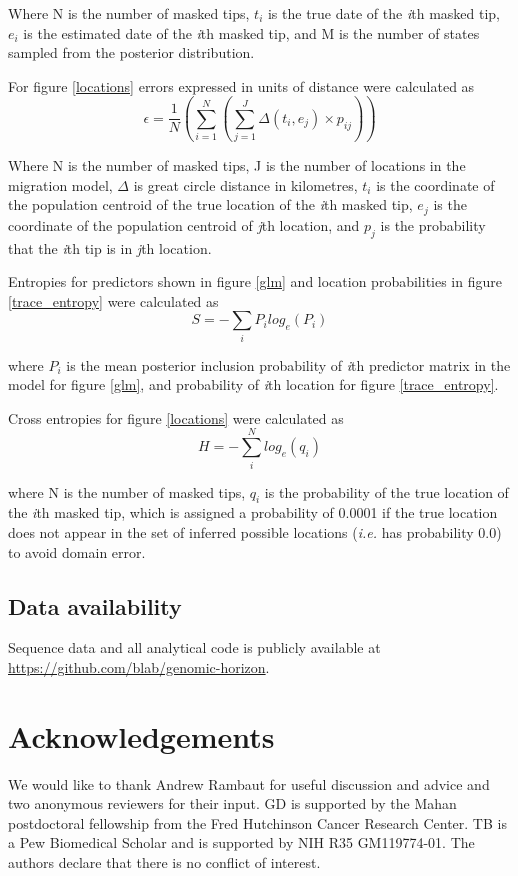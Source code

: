 \documentclass[11pt,oneside,letterpaper]{article}
\begin{document}
Where N is the number of masked tips, $t_{i}$ is the true date of the \textit{i}th masked tip, $e_{i}$ is the estimated date of the \textit{i}th masked tip, and M is the number of states  sampled from the posterior distribution.

For figure \ref{locations} errors expressed in units of distance were calculated as
\begin{equation}
  \epsilon = \frac{1}{N} (\sum_{i=1}^{N} (\sum_{j=1}^{J} \Delta(t_{i},e_{j})\times p_{ij}))
\end{equation}

Where N is the number of masked tips, J is the number of locations in the migration model, $\Delta$ is great circle distance in kilometres, $t_{i}$ is the coordinate of the population centroid of the true location of the \textit{i}th masked tip, $e_{j}$ is the coordinate of the population centroid of \textit{j}th location, and $p_{j}$ is the probability that the \textit{i}th tip is in \textit{j}th location.

Entropies for predictors shown in figure \ref{glm} and location probabilities in figure \ref{trace_entropy} were calculated as
\begin{equation}
  S = -\sum_{i} P_{i} log_{e}(P_{i})
\end{equation}

where $P_{i}$ is the mean posterior inclusion probability of \textit{i}th predictor matrix in the model for figure \ref{glm}, and probability of \textit{i}th location for figure \ref{trace_entropy}.

Cross entropies for figure \ref{locations} were calculated as
\begin{equation}
  H = -\sum_{i}^{N} log_{e}(q_{i})
\end{equation}

where N is the number of masked tips, $q_{i}$ is the probability of the true location of the \textit{i}th masked tip, which is assigned a probability of 0.0001 if the true location does not appear in the set of inferred possible locations (\textit{i.e.} has probability 0.0) to avoid domain error.

\subsection*{Data availability}
Sequence data and all analytical code is publicly available at \url{https://github.com/blab/genomic-horizon}.

\section*{Acknowledgements}
We would like to thank Andrew Rambaut for useful discussion and advice and two anonymous reviewers for their input.
GD is supported by the Mahan postdoctoral fellowship from the Fred Hutchinson Cancer Research Center.
TB is a Pew Biomedical Scholar and is supported by NIH R35 GM119774-01.
The authors declare that there is no conflict of interest.
\end{document}
